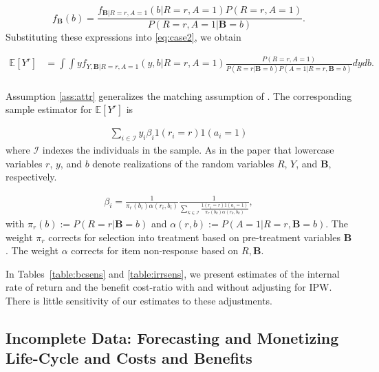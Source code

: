 \begin{equation*}
	f_{\bm{B}} (b) = \frac{f_{\bm{B}|R=r,A=1} (b | R=r,A=1 ) P(R=r,A=1)}{P(R=r,A=1|\bm{B} = b)}.
\end{equation*}
\noindent Substituting these expressions into \eqref{eq:case2}, we obtain

\begin{align*} \label{eq:case2ipw}
\mathbb{E}[Y^r] & = \int \int  y f_{Y,\bm{B}|R=r,A=1}(y,b | R=r,A=1 ) \frac{P(R=r,A=1)}{P(R=r|\bm{B} = b) P(A=1|R=r,\bm{B} = b)} dydb. \\
\end{align*}

\noindent Assumption \ref{ass:attr} generalizes the matching assumption of \citet{Campbell_Conti_etal_2014_EarlyChildhoodInvestments}. The corresponding sample estimator for $\mathbb{E}[Y^r]$ is

\begin{align*}
\sum_{i \in \mathcal{I}} y_i \beta_{i} \bm{\mathit{1}}(r_i = r) \bm{\mathit{1}}(a_i = 1)
\end{align*}
\noindent where $\mathcal{I}$ indexes the individuals in the sample. As in the paper that lowercase variables $r$, $y$, and $b$ denote realizations of the random variables $R$, $Y$, and $\bm{B}$, respectively.

\begin{align*}
	\beta_{i} = \frac{1}{\pi_r(b_i) \alpha(r_i,b_i)} \frac{1}{\sum_{k \in \mathcal{I}}{\frac{ \bm{\mathit{1}}(r_i = r)  \bm{\mathit{1}}(a_i = 1)}{\pi_r(b_k)\alpha(r_k,b_k)}}},
\end{align*}
\noindent with $\pi_r(b) := P(R=r|\bm{B}=b)$ and $\alpha(r,b) := P(A=1|R=r,\bm{B}=b)$. The weight $\pi_r$ corrects for selection into treatment based on pre-treatment variables $\bm{B}$. The weight $\alpha$ corrects for item non-response based on $R, \bm{B}$.

\noindent In Tables~\ref{table:bcsens} and \ref{table:irrsens}, we present estimates of the internal rate of return and the benefit cost-ratio with and without adjusting for IPW. There is little sensitivity of our estimates to these adjustments.

\subsection{Incomplete Data: Forecasting and Monetizing Life-Cycle and Costs and Benefits} \label{appendix:incomplete}
\label{app:method_noobs}

